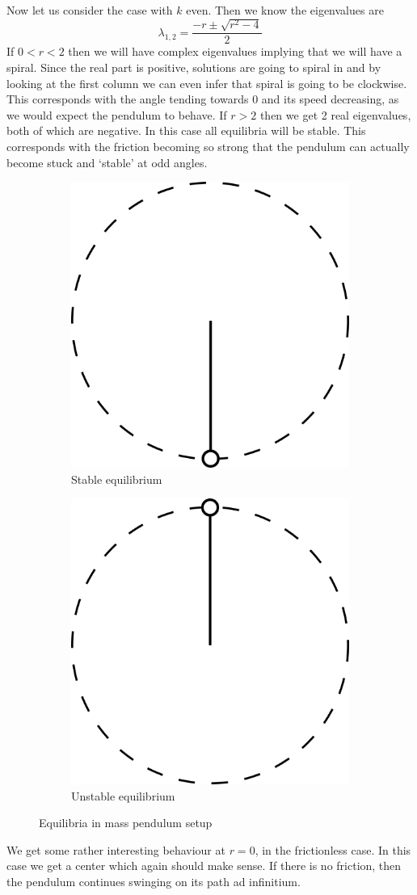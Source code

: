 Now let us consider the case with $k$ even. Then we know the eigenvalues are
$$ \lambda_{1, 2} = \frac{-r \pm \sqrt{r^2 - 4}}{2} $$
If $0 < r < 2$ then we will have complex eigenvalues implying that we will have a spiral. Since the real part is positive, solutions are going to spiral in and by looking at the first column we can even infer that spiral is going to be clockwise. This corresponds with the angle tending towards 0 and its speed decreasing, as we would expect the pendulum to behave. If $r > 2$ then we get 2 real eigenvalues, both of which are negative. In this case all equilibria will be stable. This corresponds with the friction becoming so strong that the pendulum can actually become stuck and `stable' at odd angles. 

\begin{figure}[ht]
    \centering
    \begin{subfigure}{0.5\textwidth}
        \centering
        \includegraphics[width=.5\linewidth]{Images/mass_pendulum_eq1.png}
        \caption{Stable equilibrium}
        \label{fig:mass-pend-stable}
    \end{subfigure}%
    \begin{subfigure}{0.5\textwidth}
        \centering
        \includegraphics[width=.5\linewidth]{Images/mass_pendulum_eq2.png}
        \caption{Unstable equilibrium}
        \label{fig:mass-pend-unstable}
    \end{subfigure}
    \caption{Equilibria in mass pendulum setup}
\end{figure}

We get some rather interesting behaviour at $r = 0$, in the frictionless case. In this case we get a center which again should make sense. If there is no friction, then the pendulum continues swinging on its path ad infinitium. 